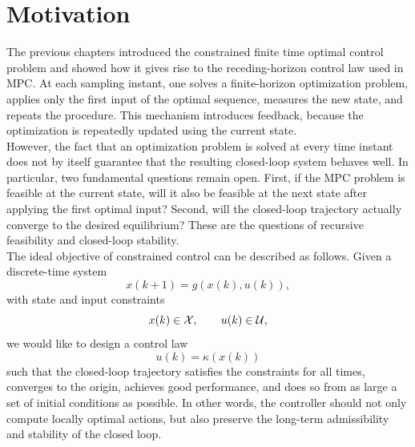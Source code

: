 \section{Motivation}

The previous chapters introduced the constrained finite time optimal control problem and showed
how it gives rise to the receding-horizon control law used in MPC. At each sampling instant,
one solves a finite-horizon optimization problem, applies only the first input of the optimal
sequence, measures the new state, and repeats the procedure. This mechanism introduces
feedback, because the optimization is repeatedly updated using the current state.\\
However, the fact that an optimization problem is solved at every time instant does not by
itself guarantee that the resulting closed-loop system behaves well. In particular, two fundamental
questions remain open. First, if the MPC problem is feasible at the current state, will it also be
feasible at the next state after applying the first optimal input? Second, will the closed-loop
trajectory actually converge to the desired equilibrium? These are the questions of recursive
feasibility and closed-loop stability.\\

The ideal objective of constrained control can be described as follows. Given a discrete-time
system
\[
    x(k+1) = g(x(k),u(k)),
\]
with state and input constraints
\[
    x(k) \in \mathcal{X}, \qquad u(k) \in \mathcal{U},
\]
we would like to design a control law
\[
    u(k) = \kappa(x(k))
\]
such that the closed-loop trajectory satisfies the constraints for all times, converges to the
origin, achieves good performance, and does so from as large a set of initial conditions as
possible. In other words, the controller should not only compute locally optimal actions, but
also preserve the long-term admissibility and stability of the closed loop.\\

